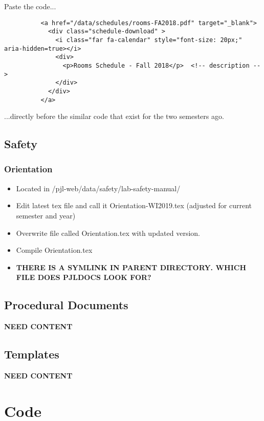 \documentclass[justified]{LabArx1_5}
\begin{document}
\begin{enumerate}
Paste the code...
\begin{lstlisting}
          <a href="/data/schedules/rooms-FA2018.pdf" target="_blank">
            <div class="schedule-download" >
              <i class="far fa-calendar" style="font-size: 20px;" aria-hidden=true></i> 
              <div>
                <p>Rooms Schedule - Fall 2018</p>  <!-- description -->
              </div>
            </div>
          </a>
\end{lstlisting}

...directly before the similar code that exist for the two semesters ago.

\end{enumerate}

\section{Safety}

\subsection{Orientation}
\begin{itemize}
\item Located in /pjl-web/data/safety/lab-safety-manual/
\item Edit latest tex file and call it Orientation-WI2019.tex (adjusted for current semester and year)
\item Overwrite file called Orientation.tex with updated version. 
\item Compile Orientation.tex
\item {\bf THERE IS A SYMLINK IN PARENT DIRECTORY. WHICH FILE DOES PJLDOCS LOOK FOR?}
\end{itemize}

\section{Procedural Documents}

{\bf NEED CONTENT}

\section{Templates}

{\bf NEED CONTENT}

\chapter{Code}
\end{document}
